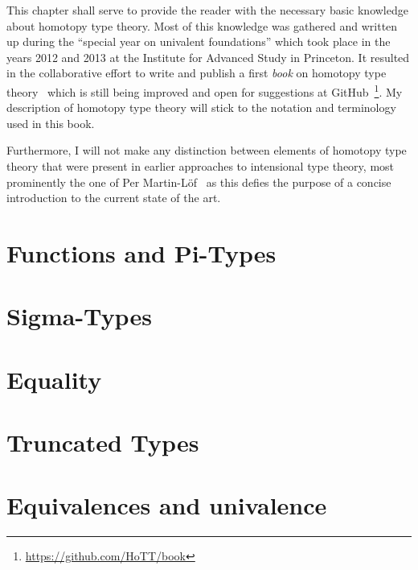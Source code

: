 This chapter shall serve to provide the reader with the necessary basic knowledge
about homotopy type theory.
Most of this knowledge was gathered and written up during the ``special year 
on univalent foundations'' which took place in the years 2012 and 2013
at the Institute for Advanced Study in Princeton.
It resulted in the collaborative effort to write and publish a first \emph{book}
on homotopy type theory~\cite{hottbook} which is still being improved and open
for suggestions at GitHub~\footnote{\url{https://github.com/HoTT/book}}.
My description of homotopy type theory will stick to the notation and terminology
used in this book.

Furthermore, I will not make any distinction between elements of homotopy type
theory that were present in earlier approaches to intensional type theory,
most prominently the one of Per Martin-Löf~\cite{martin-lof1} as this
defies the purpose of a concise introduction to the current state of the art.


\section{Functions and Pi-Types}

\section{Sigma-Types}

\section{Equality}

\section{Truncated Types}

\section{Equivalences and univalence}
